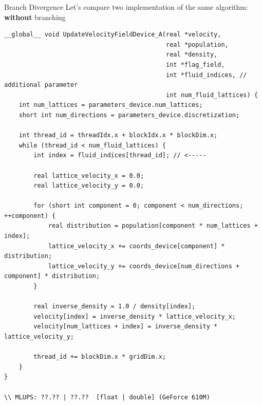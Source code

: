 \documentclass[9pt]{beamer}
\begin{document}
\begin{frame}[fragile, t]{Branch Divergence }
Let's compare two implementation of the same algorithm: \textbf{without} branching
\begin{scriptsize}
\begin{lstlisting}
__global__ void UpdateVelocityFieldDevice_A(real *velocity,
                                            real *population,
                                            real *density,
                                            int *flag_field,
                                            int *fluid_indices, // additional parameter
                                            int num_fluid_lattices) {
    int num_lattices = parameters_device.num_lattices;
    short int num_directions = parameters_device.discretization; 
    
    int thread_id = threadIdx.x + blockIdx.x * blockDim.x;
    while (thread_id < num_fluid_lattices) {
        int index = fluid_indices[thread_id]; // <-----
        
        real lattice_velocity_x = 0.0;
        real lattice_velocity_y = 0.0;
            
        for (short int component = 0; component < num_directions; ++component) {
            real distribution = population[component * num_lattices + index];
            lattice_velocity_x += coords_device[component] * distribution;
            lattice_velocity_y += coords_device[num_directions + component] * distribution;
        }

        real inverse_density = 1.0 / density[index];
        velocity[index] = inverse_density * lattice_velocity_x;
        velocity[num_lattices + index] = inverse_density * lattice_velocity_y;
        
        thread_id += blockDim.x * gridDim.x; 
    }
}

\\ MLUPS: ??.?? | ??.??  [float | double] (GeForce 610M)
\end{lstlisting}
\end{scriptsize}
\end{frame}
\end{document}
